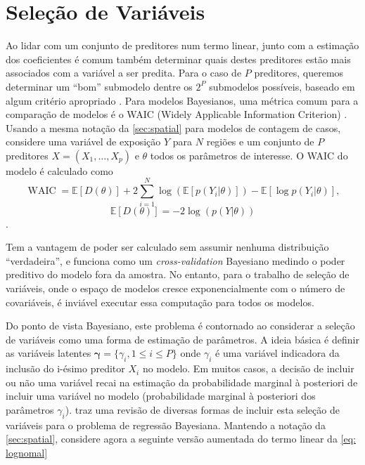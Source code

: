 \section{Seleção de Variáveis}

Ao lidar com um conjunto de preditores num termo linear, junto com a estimação dos coeficientes é comum também determinar quais destes preditores estão mais associados com a variável a ser predita. Para o caso de $P$ preditores, queremos determinar um ``bom'' submodelo dentre os $2^P$ submodelos possíveis, baseado em algum critério apropriado .  Para modelos Bayesianos, uma métrica comum para a comparação de modelos é o WAIC (Widely Applicable Information Criterion) \textcite{WAIC}. Usando a mesma notação da \autoref{sec:spatial} para modelos de contagem de casos, considere uma variável de exposição $Y$ para $N$ regiões e um conjunto de $P$ preditores $X = (X_1, \dots, X_p)$ e $\theta$ todos os parâmetros de interesse.
O WAIC  do modelo é calculado como
\begin{equation}
\label{WAIC}
    \operatorname{WAIC} = \mathds{E}[D(\theta)] + 2\sum_{i=1}^N \log(\mathds{E}[p(Y_i|\theta)]) - \mathds{E}[\log p(Y_i|\theta)],
\end{equation}
\[\mathds{E}[D(\theta)] = -2\log(p(Y|\theta))\].

Tem a vantagem de poder ser calculado sem assumir nenhuma distribuição ``verdadeira'', e funciona como um \textit{cross-validation} Bayesiano medindo o poder preditivo do modelo fora da amostra. No entanto, para o trabalho de seleção de variáveis, onde o espaço de modelos cresce exponencialmente com o número de covariáveis, é inviável executar essa computação para todos os modelos.

Do ponto de vista Bayesiano, este problema é contornado ao considerar a seleção de variáveis como uma forma de estimação de parâmetros. A ideia básica é definir as variáveis latentes $\boldsymbol{\gamma} = \{\gamma_i, 1 \leq i \leq P\}$ onde $\gamma_i$ é uma variável indicadora da inclusão do i-ésimo preditor $X_i$ no modelo. Em muitos casos, a decisão de incluir ou não uma variável recai na estimação da probabilidade marginal à posteriori de incluir uma variável no modelo (probabilidade marginal à posteriori dos parâmetros $\gamma_i$). \cite{Ohara2009} traz uma revisão de diversas formas de incluir esta seleção de variáveis para o problema de regressão Bayesiana. Mantendo a notação da \autoref{sec:spatial}, considere agora a seguinte versão aumentada do termo linear da \autoref{eq: lognomal}

